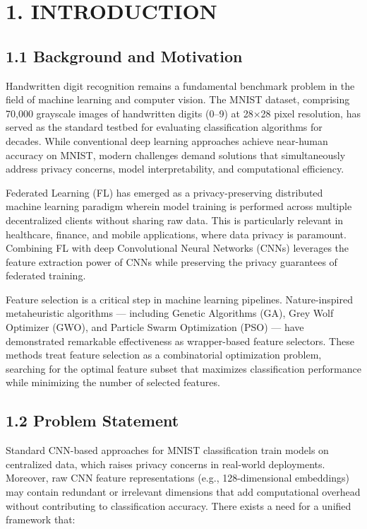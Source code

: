 \documentclass[
]{article}
\begin{document}
\hypertarget{introduction}{%
\section{1. INTRODUCTION}\label{introduction}}

\hypertarget{background-and-motivation}{%
\subsection{1.1 Background and
Motivation}\label{background-and-motivation}}

Handwritten digit recognition remains a fundamental benchmark problem in
the field of machine learning and computer vision. The MNIST dataset,
comprising 70,000 grayscale images of handwritten digits (0--9) at 28×28
pixel resolution, has served as the standard testbed for evaluating
classification algorithms for decades. While conventional deep learning
approaches achieve near-human accuracy on MNIST, modern challenges
demand solutions that simultaneously address privacy concerns, model
interpretability, and computational efficiency.

Federated Learning (FL) has emerged as a privacy-preserving distributed
machine learning paradigm wherein model training is performed across
multiple decentralized clients without sharing raw data. This is
particularly relevant in healthcare, finance, and mobile applications,
where data privacy is paramount. Combining FL with deep Convolutional
Neural Networks (CNNs) leverages the feature extraction power of CNNs
while preserving the privacy guarantees of federated training.

Feature selection is a critical step in machine learning pipelines.
Nature-inspired metaheuristic algorithms --- including Genetic
Algorithms (GA), Grey Wolf Optimizer (GWO), and Particle Swarm
Optimization (PSO) --- have demonstrated remarkable effectiveness as
wrapper-based feature selectors. These methods treat feature selection
as a combinatorial optimization problem, searching for the optimal
feature subset that maximizes classification performance while
minimizing the number of selected features.

\hypertarget{problem-statement}{%
\subsection{1.2 Problem Statement}\label{problem-statement}}

Standard CNN-based approaches for MNIST classification train models on
centralized data, which raises privacy concerns in real-world
deployments. Moreover, raw CNN feature representations (e.g.,
128-dimensional embeddings) may contain redundant or irrelevant
dimensions that add computational overhead without contributing to
classification accuracy. There exists a need for a unified framework
that:
\end{document}
